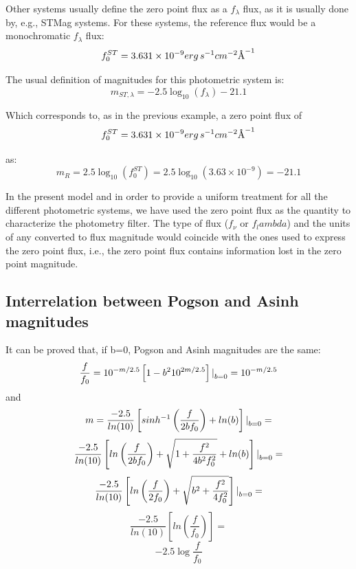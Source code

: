 \documentclass[11pt,a4paper]{ivoa}
\newcommand{\angstrom}{\mbox{\normalfont\AA}}
\begin{document}
\begin{appendices}
Other systems usually define the zero point flux as a $f_\lambda $ flux, as
it is usually done by, e.g., STMag systems. For these systems, the reference
flux would be a monochromatic $f_\lambda $ flux:
\begin{equation} \label{eq:40}
f_0 ^{ST} = 3.631 \times 10^{-9} erg\, s^{-1} cm^{-2} \angstrom ^{-1}
\end{equation}

The usual definition of magnitudes for this photometric system is:
\begin{equation} \label{eq:41}
m_{ST,\lambda }=-2.5\log_{10} (f_\lambda )-21.1
\end{equation}

Which corresponds to, as in the previous example, a zero point flux of
\begin{equation} \label{eq:42}
f_0 ^{ST}=3.631 \times 10^{-9} erg\, s^{-1} cm^{-2} \angstrom ^{-1}
\end{equation}

as:
\begin{equation} \label{eq:43}
m_R =2.5\log_{10} (f_0 ^{ST})=2.5\log_{10} (3.63\times 10^{-9})=-21.1
\end{equation}

In the present model and in order to provide a uniform treatment for all the
different photometric systems, we have used the zero point flux as the quantity
to characterize the photometry filter. The type of flux ($f_\nu $ or $f_lambda $)
and the units of any converted to flux magnitude would coincide with the ones
used to express the zero point flux, i.e., the zero point flux contains information
lost in the zero point magnitude.
\par

\subsection{Interrelation between Pogson and Asinh magnitudes}
It can be proved that, if b=0, Pogson and Asinh magnitudes are the same:
\begin{equation} \label{eq:44}
\frac{f}{f_0}=10^{-m/2.5}\left[ 1-b^2 10^{2m/2.5}\right] \text{\textbar}_{b=0} =10^{-m/2.5}
\end{equation}
and
\begin{equation} \label{eq:45}
m=\frac{-2.5}{ln(10)}\left[ sinh^{-1} \left(\frac{f}{2bf_0}\right) + ln(b)\right] \text{\textbar}_{b=0} =
\end{equation}
\[
\frac{-2.5}{ln(10)}\left[ ln\left(\frac{f}{2bf_0}\right) + \sqrt{1+\frac{f^2}{4b^2 f_0^2}} + ln(b)\right] \text{\textbar}_{b=0} =
\]
\[
\frac{-2.5}{ln(10)}\left[ ln\left(\frac{f}{2f_0}\right) + \sqrt{b^2+\frac{f^2}{4 f_0^2}}\right] \text{\textbar}_{b=0} =
\]
\[
\frac{-2.5}{ln(10)}\left[ ln(\frac{f}{f_0}) \right] =
\]
\[
-2.5\log{\frac{f}{f_0}}
\]



\end{appendices}
\end{document}
